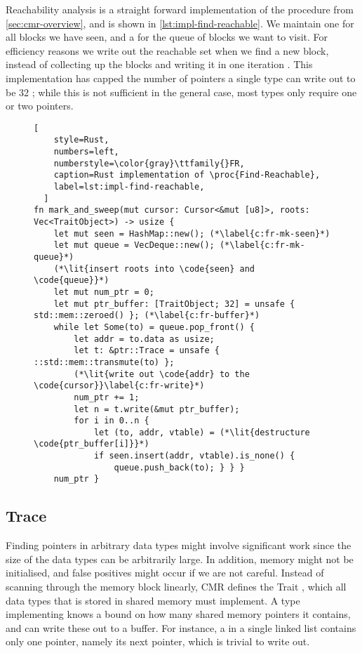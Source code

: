 Reachability analysis is a straight forward implementation of the  procedure
from \cref{sec:cmr-overview}, and is shown in \cref{lst:impl-find-reachable}. We maintain one
  for all blocks we have seen, and a 
 for the queue of blocks we want to visit. For efficiency reasons
we write out the reachable set when we find a new block, instead of collecting up the blocks and
writing it in one iteration . This implementation has capped the
number of pointers a single type can write out to be 32 ; while this
is not sufficient in the general case, most types only require one or two pointers.



\begin{figure}[ht]
  \begin{lstlisting}[
    style=Rust,
    numbers=left,
    numberstyle=\color{gray}\ttfamily{}FR,
    caption=Rust implementation of \proc{Find-Reachable},
    label=lst:impl-find-reachable,
  ]
fn mark_and_sweep(mut cursor: Cursor<&mut [u8]>, roots: Vec<TraitObject>) -> usize {
    let mut seen = HashMap::new(); (*\label{c:fr-mk-seen}*)
    let mut queue = VecDeque::new(); (*\label{c:fr-mk-queue}*)
    (*\lit{insert roots into \code{seen} and \code{queue}}*)
    let mut num_ptr = 0;
    let mut ptr_buffer: [TraitObject; 32] = unsafe { std::mem::zeroed() }; (*\label{c:fr-buffer}*)
    while let Some(to) = queue.pop_front() {
        let addr = to.data as usize;
        let t: &ptr::Trace = unsafe { ::std::mem::transmute(to) };
        (*\lit{write out \code{addr} to the \code{cursor}}\label{c:fr-write}*)
        num_ptr += 1;
        let n = t.write(&mut ptr_buffer);
        for i in 0..n {
            let (to, addr, vtable) = (*\lit{destructure \code{ptr_buffer[i]}}*)
            if seen.insert(addr, vtable).is_none() {
                queue.push_back(to); } } }
    num_ptr }
\end{lstlisting}
\end{figure}


\subsection{Trace\label{sec:impl-trace}}

Finding pointers in arbitrary data types might involve significant work since the size of the data
types can be arbitrarily large. In addition, memory might not be initialised, and false positives
might occur if we are not careful. Instead of scanning through the memory block linearly, CMR
defines the Trait , which all data types that is stored in shared memory must
implement.  A type implementing  knows a bound on how many shared memory pointers it
contains, and can write these out to a buffer. For instance, a  in a single linked list
contains only one pointer, namely its next pointer, which is trivial to write out.

